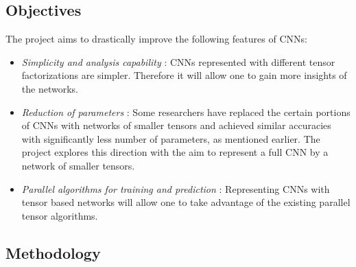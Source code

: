 \subsection*{Objectives}

The \prname project aims to drastically improve the following features of CNNs:
\begin{itemize}
	\item \emph{Simplicity and analysis capability} : CNNs represented with different tensor factorizations are simpler. Therefore it will allow one to gain more insights of the networks.
	\item \emph{Reduction of parameters} : Some researchers have replaced the certain portions of CNNs with  networks of smaller tensors and achieved  similar accuracies with significantly less number of parameters, as mentioned earlier. The \prname project explores this direction with the aim to represent a full CNN by a network of smaller tensors. 
	\item \emph{Parallel algorithms for training and prediction} : Representing CNNs with tensor based networks will allow one to take advantage of the existing parallel tensor algorithms.
\end{itemize}


\subsection*{Methodology} 

